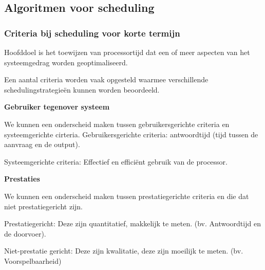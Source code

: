 \subsection{Algoritmen voor scheduling}

\subsubsection{Criteria bij scheduling voor korte termijn}

Hoofddoel is het toewijzen van processortijd dat een of meer aspecten van het systeemgedrag worden geoptimaliseerd.

Een aantal criteria worden vaak opgesteld waarmee verschillende schedulingstrategieën kunnen worden beoordeeld.

\textbf{Gebruiker tegenover systeem}

We kunnen een onderscheid maken tussen gebruikersgerichte criteria en 
systeemgerichte cirteria. 
Gebruikersgerichte criteria: antwoordtijd (tijd tussen de aanvraag en de output).

Systeemgerichte criteria: Effectief en efficiënt gebruik van de processor.

\textbf{Prestaties}

We kunnen een onderscheid maken tussen prestatiegerichte criteria en die dat niet prestatiegericht zijn. 

Prestatiegericht: Deze zijn quantitatief, makkelijk te meten. (bv. Antwoordtijd en de doorvoer).

Niet-prestatie gericht: Deze zijn kwalitatie, deze zijn moeilijk te meten. (bv. Voorspelbaarheid)

